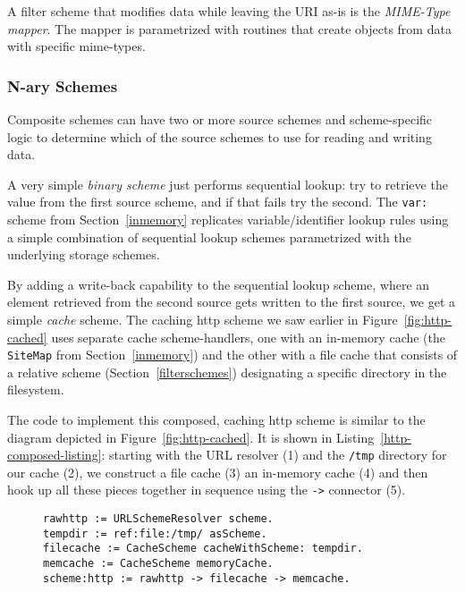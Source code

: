 \documentclass[preprint]{sigplanconf}
\begin{document}

A filter scheme that modifies data while leaving the URI as-is is the \emph{MIME-Type mapper}.
The mapper is parametrized with routines that create objects from data with specific
mime-types.  


\subsubsection{N-ary Schemes}

Composite schemes can have two or more source schemes and scheme-specific logic
to determine which of the source schemes to use for reading and writing data.

A very simple \emph{binary scheme} just performs sequential lookup:  try to
retrieve the value from the first source scheme, and if that fails try the second.
The {\tt var:} scheme from Section~\ref{inmemory}  replicates variable/identifier
lookup rules using a simple combination of sequential lookup schemes parametrized
with the underlying storage schemes.

By adding a write-back capability to the sequential lookup scheme, where an element
retrieved from the second source gets written to the first source, we get a simple \emph{cache} scheme.  
The caching http scheme we saw earlier in Figure~\ref{fig:http-cached} uses
separate cache scheme-handlers, one with an in-memory cache (the {\tt SiteMap} from Section~\ref{inmemory})
and the other with a file cache that consists of a relative scheme (Section~\ref{filterschemes}) 
designating a specific directory in the filesystem.

The code to implement this composed, caching http scheme is similar 
to the diagram depicted in Figure~\ref{fig:http-cached}.  It is shown in Listing~\ref{http-composed-listing}:  
starting with the URL resolver (1) and the {\tt /tmp} directory for our cache (2), we construct
a file cache (3) an in-memory cache (4) and then hook up all these pieces together
in sequence using the {\tt ->} connector (5).

\begin{figure}[htbp]
\begin{lstlisting}[style=numbers,label=http-composed-listing,caption=Code for caching http stack.]
rawhttp := URLSchemeResolver scheme.
tempdir := ref:file:/tmp/ asScheme.
filecache := CacheScheme cacheWithScheme: tempdir.
memcache := CacheScheme memoryCache.
scheme:http := rawhttp -> filecache -> memcache.
\end{lstlisting}
\end{figure}
\end{document}
